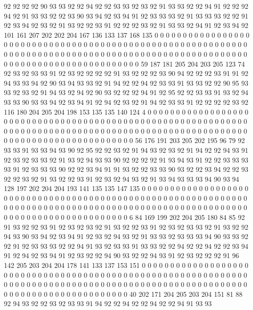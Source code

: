 92 92 92 92 90 93 93 92 92 94 92 92 93 93 92 93 92 91 93 93
92 92 94 91 92 92 92 94 92 91 93 93 92 92 93 90 93 94 92 93
94 91 92 93 93 93 92 91 93 93 93 92 92 91 92 93 94 92 93 92
91 93 92 92 93 91 92 92 92 93 92 91 93 93 92 94 91 92 93 94
92 101 161 207 202 202 204 167 136 133 137 168 135 0 0 0 0 0 0 0
0 0 0 0 0 0 0 0 0 0 0 0 0 0 0 0 0 0 0 0
0 0 0 0 0 0 0 0 0 0 0 0 0 0 0 0 0 0 0 0
0 0 0 0 0 0 0 0 0 0 0 0 0 0 0 0 0 0 0 0
0 0 0 0 0 0 0 0 0 0 0 0 0 0 0 0 0 0 0 0
0 0 0 0 0 0 0 0 0 0 0 0 0 0 0 0 0 0 0 0
0 0 0 0 0 0 0 0 0 0 0 0 0 0 0 0 0 0 0 0
59 187 181 205 204 203 205 123 74 92 93 92 93 93 91 92 93 92 92 92
92 91 93 92 92 92 93 90 94 92 92 92 93 91 91 92 94 93 93 94
92 90 93 94 93 93 92 91 94 92 92 94 92 93 93 91 93 93 92 92
90 95 93 93 92 93 92 91 94 93 92 94 92 90 93 92 92 92 94 91
92 95 92 92 93 93 91 93 92 94 93 93 90 93 93 94 92 93 94 91
92 94 92 93 92 91 94 92 93 93 91 92 92 92 92 93 92 116 180 204
205 204 198 153 135 135 140 124 4 0 0 0 0 0 0 0 0 0 0 0
0 0 0 0 0 0 0 0 0 0 0 0 0 0 0 0 0 0 0 0
0 0 0 0 0 0 0 0 0 0 0 0 0 0 0 0 0 0 0 0
0 0 0 0 0 0 0 0 0 0 0 0 0 0 0 0 0 0 0 0
0 0 0 0 0 0 0 0 0 0 0 0 0 0 0 0 0 0 0 0
0 0 0 0 0 0 0 0 0 0 0 0 0 0 0 0 0 0 0 0
0 0 0 0 0 0 0 0 0 0 0 0 0 0 0 0 56 176 191 203
205 202 195 96 79 92 93 93 91 93 93 94 93 90 92 95 92 92 93 92
91 94 93 92 93 92 91 94 92 92 94 93 91 92 93 92 93 93 92 91
93 92 94 93 93 90 92 92 92 92 91 93 94 93 91 92 92 93 93 93
93 91 92 93 93 93 90 92 92 93 94 91 91 93 92 92 93 93 90 93
92 92 93 94 92 92 93 92 92 93 92 91 93 92 92 93 91 92 93 92
94 93 92 91 93 94 93 93 93 94 90 93 94 128 197 202 204 204 193 141
135 135 147 135 0 0 0 0 0 0 0 0 0 0 0 0 0 0 0 0
0 0 0 0 0 0 0 0 0 0 0 0 0 0 0 0 0 0 0 0
0 0 0 0 0 0 0 0 0 0 0 0 0 0 0 0 0 0 0 0
0 0 0 0 0 0 0 0 0 0 0 0 0 0 0 0 0 0 0 0
0 0 0 0 0 0 0 0 0 0 0 0 0 0 0 0 0 0 0 0
0 0 0 0 0 0 0 0 0 0 0 0 0 0 0 0 0 0 0 0
0 0 0 0 0 0 0 0 0 0 0 6 84 169 199 202 204 205 180 84
85 92 91 93 92 92 93 91 92 93 92 93 92 91 93 92 92 93 91 92
93 92 93 93 92 91 93 92 92 94 93 90 93 94 92 93 94 91 92 93
92 94 93 92 91 93 93 92 93 93 93 94 90 93 93 92 92 91 92 93
93 93 92 92 94 91 93 92 93 93 91 93 93 92 92 94 92 92 94 92
92 93 94 91 92 94 92 93 94 91 92 93 92 92 94 90 93 92 92 94
93 91 92 93 92 92 92 91 96 142 205 203 204 204 178 141 133 137 153 151
0 0 0 0 0 0 0 0 0 0 0 0 0 0 0 0 0 0 0 0
0 0 0 0 0 0 0 0 0 0 0 0 0 0 0 0 0 0 0 0
0 0 0 0 0 0 0 0 0 0 0 0 0 0 0 0 0 0 0 0
0 0 0 0 0 0 0 0 0 0 0 0 0 0 0 0 0 0 0 0
0 0 0 0 0 0 0 0 0 0 0 0 0 0 0 0 0 0 0 0
0 0 0 0 0 0 0 0 0 0 0 0 0 0 0 0 0 0 0 0
0 0 0 0 0 0 0 40 202 171 204 205 203 204 151 81 88 92 94 93
92 92 93 92 93 93 91 94 92 92 94 92 92 94 92 92 94 91 93 93
